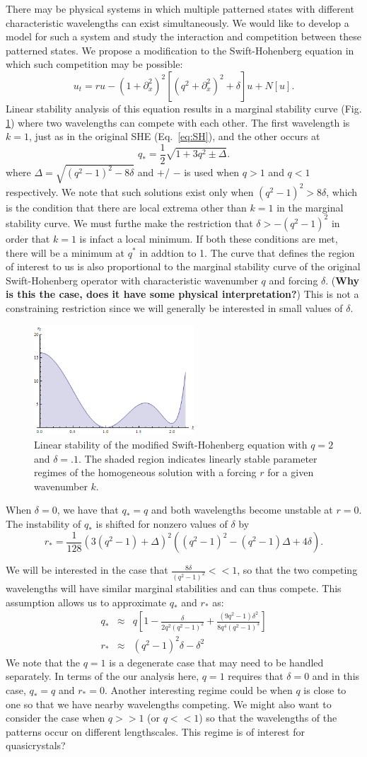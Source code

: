 \documentclass[api,pof,pre,12pt,a4paper]{revtex4-1}
\newcommand{\beqn}{\begin{equation}}
\newcommand{\eeqn}{\end{equation}}
\newcommand{\beqa}{\begin{eqnarray}}
\newcommand{\eeqa}{\end{eqnarray}}
\newcommand{\NOTE}[1]{\marginpar{\footnotesize\textbf{NOTE}} (\textbf{#1})}
\newcommand{\FIGmarginalstability}{
\begin{figure}[h]\center
\includegraphics[width=60mm]{MarginalStability.png}
\caption{\label{fig:marginalstability} Linear stability of the modified Swift-Hohenberg equation with $q=2$ and $\delta=.1$.  The shaded region indicates linearly stable parameter regimes of the homogeneous solution with a forcing $r$ for a given wavenumber $k$.}
\end{figure}
}
\begin{document}
There may be physical systems in which multiple patterned states with different characteristic wavelengths can exist simultaneously.  We would like to develop a model for such a system and study the interaction and competition between these patterned states.  We propose a modification to the Swift-Hohenberg equation in which such competition may be possible:
\begin{equation}
u_t= r u-\left(1+\partial_{x}^2\right)^2 \left[\left(q^2+\partial_{x}^2\right)^2+\delta \right] u+N[u]\label{eq:SHm}.
\end{equation}
Linear stability analysis of this equation results in a marginal stability curve (Fig. \ref{fig:marginalstability}) where two wavelengths can compete with each other.  The first wavelength is  $k=1$, just as in the original SHE (Eq.~\ref{eq:SH}), and the other occurs at 
\beqn
q_*=\frac{1}{2}\sqrt{1+3q^2 \pm\Delta}.
\eeqn
where $\Delta=\sqrt{(q^2-1)^2-8\delta}$ and $+$/ $-$ is used when $q>1$ and $q<1$ respectively.  We note that such solutions exist only when $(q^2-1)^2>8\delta$, which is the condition that there are  local extrema other than $k=1$ in the marginal stability curve.  We must furthe make the restriction that $\delta>-(q^2-1)^2$ in order that $k=1$ is infact a local minimum.  If both these conditions are met, there will be a minimum at $q^*$ in addtion to 1.  The curve that defines the region of interest to us is also proportional to the marginal stability curve of the original Swift-Hohenberg operator with characteristic wavenumber $q$ and forcing $\delta$.  \NOTE{Why is this the case, does it have some physical interpretation?}  This is not a constraining restriction since we will generally be interested in small values of $\delta$.
\FIGmarginalstability
When $\delta=0$, we have that $q_*=q$  and both wavelengths  become unstable at $r=0$. The instability of $q_*$ is shifted for nonzero values of $\delta$ by
\beqn
r_*=\frac{1}{128} \left(3( q^2-1)+\Delta\right)^2 \left( (q^2-1)^2- (q^2-1)\Delta+4 \delta \right).
\eeqn

We will be interested in the case that $\tfrac{8\delta}{(q^2-1)^2}<<1$,  so that the two competing wavelengths will have similar marginal stabilities and can thus compete.  This assumption allows us to approximate $q_*$ and $r_*$ as:
\beqa
q_*&\approx&q\left[1-\frac{\delta}{2q^2(q^2-1)^2}+\frac{\left(9 q^2-1\right) \delta ^2}{8 q^4 \left(q^2-1\right)^3}\right] \\
r_*&\approx& (q^2-1)^2 \delta-\delta^2
\eeqa
We note that the $q=1$ is a degenerate case that may need to be handled separately.  In terms of the our analysis here, $q=1$ requires that $\delta=0$ and in this case, $q_*=q$ and $r_*=0$.  Another interesting regime could be when $q$ is close to one so that we have nearby wavelengths competing. We might also want to consider the case when $q>>1$ (or $q<<1$) so that the wavelengths of the patterns occur on different lengthscales.  This regime is of interest for quasicrystals?
\end{document}
